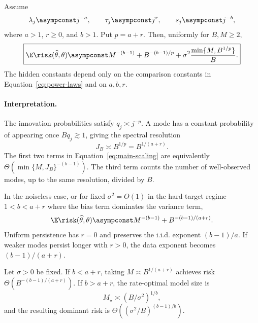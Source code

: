 \begin{theorem}
\label{thm:scaling}
Assume
\begin{equation}
\lambda_j\asympconst j^{-a},
\qquad
\tau_j\asympconst j^r,
\qquad
s_j\asympconst j^{-b},
\label{eq:power-laws}
\end{equation}
where $a>1$, $r\ge0$, and $b>1$. Put $p=a+r$. Then, uniformly for
$B,M\ge2$,
\begin{equation}
\boxed{
\E\risk(\widehat\theta,\theta)
\asympconst
M^{-(b-1)}
+B^{-(b-1)/p}
+\sigma^2\frac{\min\{M,B^{1/p}\}}{B}.}
\label{eq:main-scaling}
\end{equation}
The hidden constants depend only on the comparison constants in
Equation~\eqref{eq:power-laws} and on $a,b,r$.
\end{theorem}

\paragraph{Interpretation.}
The innovation probabilities satisfy $q_j\asymp j^{-p}$. A mode has a
constant probability of appearing once $Bq_j\gtrsim1$, giving the spectral
resolution
\begin{equation}
J_B\asymp B^{1/p}=B^{1/(a+r)}.
\label{eq:JB}
\end{equation}
The first two terms in Equation~\eqref{eq:main-scaling} are equivalently
$\Theta(\min\{M,J_B\}^{-(b-1)})$. The third term counts the number of
well-observed modes, up to the same resolution, divided by $B$.

\begin{corollary}
\label{cor:exponent}
In the noiseless case, or for fixed $\sigma^2=O(1)$ in the hard-target regime
$1<b<a+r$ where the bias term dominates the variance term,
\begin{equation}
\E\risk(\widehat\theta,\theta)
\asympconst M^{-(b-1)}+B^{-(b-1)/(a+r)}.
\label{eq:clean-law}
\end{equation}
Uniform persistence has $r=0$ and preserves the i.i.d. exponent
$(b-1)/a$. If weaker modes persist longer with $r>0$, the data exponent becomes
$(b-1)/(a+r)$.
\end{corollary}

\begin{corollary}
\label{cor:model-choice}
Let $\sigma>0$ be fixed. If $b<a+r$, taking
$M\asymp B^{1/(a+r)}$ achieves risk
$\Theta(B^{-(b-1)/(a+r)})$. If $b>a+r$, the rate-optimal model size is
\begin{equation}
M_\star\asymp(B/\sigma^2)^{1/b},
\label{eq:optimal-M}
\end{equation}
and the resulting dominant risk is
$\Theta((\sigma^2/B)^{(b-1)/b})$.
\end{corollary}

